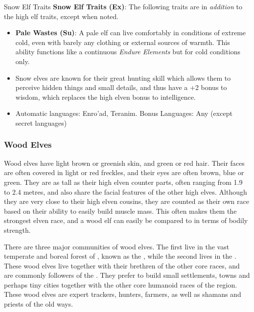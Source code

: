 \begin{35e}{Snow Elf Traits}
  \textbf{Snow Elf Traits (Ex)}: The following traits are in \emph{addition}
  to the high elf traits, except when noted.
  \begin{itemize}[noitemsep]
    \item \textbf{Pale Wastes (Su)}: A pale elf can live comfortably in
      conditions of extreme cold, even with barely any clothing or external
      sources of warmth. This ability functions like a continuous \emph{Endure
      Elements} but for cold conditions only.
    \item Snow elves are known for their great hunting skill which allows them
      to perceive hidden things and small details, and thus have a +2 bonus to
      wisdom, which replaces the high elven bonus to intelligence.
    \item Automatic languages: Enro'ad, Teranim. Bonus Languages: Any (except
      secret languages)
  \end{itemize}
\end{35e}

\subsubsection{Wood Elves}
\label{sec:Wood Elves}

Wood elves have light brown or greenish skin, and green or red hair. Their
faces are often covered in light or red freckles, and their eyes are often
brown, blue or green. They are as tall as their high elven counter parts,
often ranging from 1.9 to 2.4 metres, and also share the facial features of
the other high elves. Although they are very close to their high elven
cousins, they are counted as their own race based on their ability to easily
build muscle mass. This often makes them the strongest elven race, and a wood
elf can easily be compared to  in terms of bodily
strength.

There are three major communities of wood elves. The first live in the vast
temperate and boreal forest of , known as the
, while the second lives in the . These wood elves live together with their brethren of the other
core races, and are commonly followers of the . They
prefer to build small settlements, towns and perhaps tiny cities together
with the other core humanoid races of the region. These wood elves are expert
trackers, hunters, farmers, as well as shamans and priests of the old ways.

